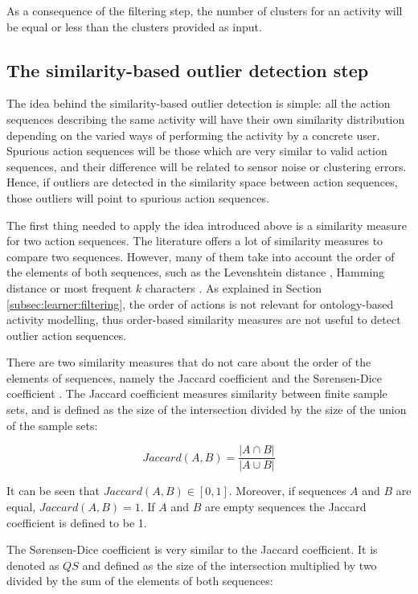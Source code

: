 As a consequence of the filtering step, the number of clusters for an activity will be equal or less than the clusters provided as input.


\subsection{The similarity-based outlier detection step}
\label{subsec:learner:outlier}
The idea behind the similarity-based outlier detection is simple: all the action sequences describing the same activity will have their own similarity distribution depending on the varied ways of performing the activity by a concrete user. Spurious action sequences will be those which are very similar to valid action sequences, and their difference will be related to sensor noise or clustering errors. Hence, if outliers are detected in the similarity space between action sequences, those outliers will point to spurious action sequences. 

The first thing needed to apply the idea introduced above is a similarity measure for two action sequences. The literature offers a lot of similarity measures to compare two sequences. However, many of them take into account the order of the elements of both sequences, such as the Levenshtein distance \cite{Levenshtein1966}, Hamming distance \cite{Hamming1950} or most frequent $k$ characters \cite{Seker2014}. As explained in Section \ref{subsec:learner:filtering}, the order of actions is not relevant for ontology-based activity modelling, thus order-based similarity measures are not useful to detect outlier action sequences.

There are two similarity measures that do not care about the order of the elements of sequences, namely the Jaccard coefficient \cite{A.K.Jain1988} and the S{\o}rensen-Dice coefficient \cite{Sorensen1948}. The Jaccard coefficient measures similarity between finite sample sets, and is defined as the size of the intersection divided by the size of the union of the sample sets:

\begin{equation}
\label{eq-jaccard}
  Jaccard(A, B) = \frac{|A \cap B|}{|A \cup B|}
 \end{equation}

It can be seen that $Jaccard(A, B) \in [0, 1]$. Moreover, if sequences $A$ and $B$ are equal, $Jaccard(A, B) = 1$. If $A$ and $B$ are empty sequences the Jaccard coefficient is defined to be 1.

The S{\o}rensen-Dice coefficient is very similar to the Jaccard coefficient. It is denoted as $QS$ and defined as the size of the intersection multiplied by two divided by the sum of the elements of both sequences:

